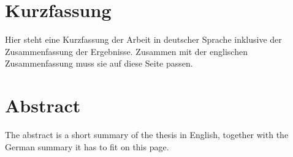 \thispagestyle{plain}

\section*{Kurzfassung}
Hier steht eine Kurzfassung der Arbeit in deutscher Sprache inklusive der Zusammenfassung der
Ergebnisse.
Zusammen mit der englischen Zusammenfassung muss sie auf diese Seite passen.

\section*{Abstract}
\begin{english}
The abstract is a short summary of the thesis in English, together with the German summary it has to fit on this page.
\end{english}
